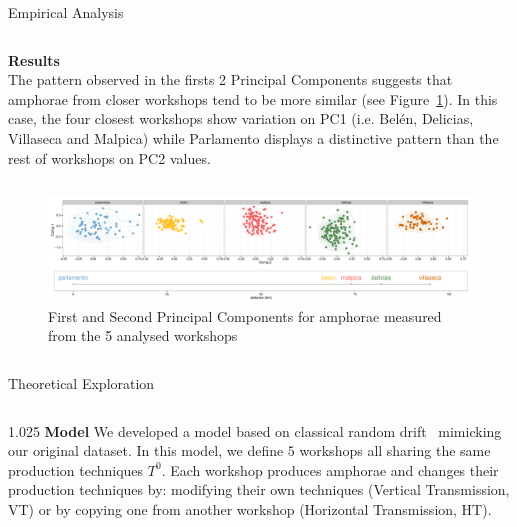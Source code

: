 \documentclass[final]{beamer}
\newlength{\onecolwid}
\newlength{\twocolwid}
\begin{document}
\begin{frame}[t]
\begin{columns}[t]
\begin{column}{\twocolwid}
\begin{block}{Empirical Analysis}
\begin{columns}[t,totalwidth=\twocolwid]
\begin{column}{\onecolwid} %

{\textbf{Results}}\\
\justify
The pattern observed in the firsts 2 Principal Components suggests that amphorae from closer workshops tend to be more similar (see Figure~\ref{fig:pca}). In this case, the four closest workshops show variation on PC1 (i.e. Bel\'en, Delicias, Villaseca and Malpica) while Parlamento displays a distinctive pattern than the rest of workshops on PC2 values.


\end{column}
\end{columns}

\begin{columns}[t,totalwidth=\twocolwid]


\begin{column}{\twocolwid} %
\begin{figure}
\includegraphics[width=0.6\linewidth]{images/fig2.pdf}
\singlespace
\caption{First and Second Principal Components for amphorae measured from the 5 analysed workshops}
\label{fig:pca}
\end{figure}
\end{column}
\end{columns}
\end{block}
\vspace{-1cm}
\begin{block}{Theoretical Exploration}

\begin{columns}[t,totalwidth=\twocolwid]

\begin{column}{1.025\onecolwid} %
{\textbf{Model }}
\justify
We developed a model based on classical random drift~\cite{bentley2004randomdriftandculturechange} mimicking our original dataset. In this model, we define $5$ workshops all sharing the same production techniques $T^{0}$. 
Each workshop produces amphorae and changes their production techniques by: modifying their own techniques (Vertical Transmission, VT) or by copying one from another workshop (Horizontal Transmission, HT). 


\end{column}
\end{columns}
\end{block}
\end{column}
\end{columns}
\end{frame}
\end{document}
